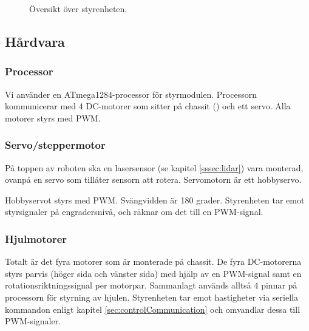 \documentclass[a4paper,11pt]{article}
\begin{document}
\begin{figure}[h!]
    \caption{Översikt över styrenheten.}
    \label{fig:unitMotorcontroller}
\end{figure}

\subsection{Hårdvara}

\subsubsection{Processor}
Vi använder en ATmega1284-processor för styrmodulen. Processorn kommunicerar med 4 DC-motorer som sitter på chassit (\cite{terminator}) och ett servo. Alla motorer styrs med PWM.

\clearpage

\subsubsection{Servo/steppermotor} \label{ssec:servomotor}
På toppen av roboten ska en lasersensor (se kapitel \ref{sssec:lidar}) vara monterad, ovanpå en servo som tillåter sensorn att rotera. Servomotorn är ett hobbyservo.

Hobbyservot styrs med PWM. Svängvidden är 180 grader. Styrenheten tar emot styrsignaler på engradersnivå, och räknar om det till en PWM-signal.

\subsubsection{Hjulmotorer}
Totalt är det fyra motorer som är monterade på chassit. De fyra DC-motorerna styrs parvis (höger sida och vänster sida) med hjälp av en PWM-signal samt en rotationsriktningssignal per motorpar. Sammanlagt används alltså 4 pinnar på processorn för styrning av hjulen. Styrenheten tar emot hastigheter via seriella kommandon enligt kapitel \ref{sec:controlCommunication} och omvandlar dessa till PWM-signaler.
\end{document}
